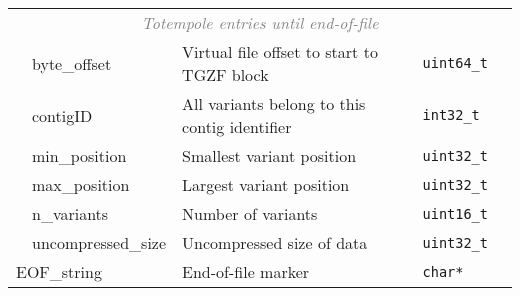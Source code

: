 \documentclass[10pt]{article}
\begin{document}
\begin{table}[H]
{\begin{tabular}{|l|l|l|l|r|}
  \multicolumn{5}{|c|}{\textcolor{gray}{\it Totempole entries until end-of-file}} \\\cline{2-5}
  & {\sf byte\_offset} & Virtual file offset to start to TGZF block & {\tt uint64\_t} & \\\cline{2-5}
  & {\sf contigID} & All variants belong to this contig identifier & {\tt int32\_t} & \\\cline{2-5}
    & {\sf min\_position} & Smallest variant position & {\tt uint32\_t} & \\\cline{2-5}
  & {\sf max\_position} & Largest variant position & {\tt uint32\_t} & \\\cline{2-5}
    & {\sf n\_variants} & Number of variants & {\tt uint16\_t} & \\\cline{2-5}
  & {\sf uncompressed\_size} & Uncompressed size of data & {\tt uint32\_t} & \\\cline{2-5}
  \multicolumn{2}{|l|}{\sf EOF\_string} & End-of-file marker & {\tt char*} & \\\cline{1-5}
\end{tabular}}
\end{table}
\end{document}
